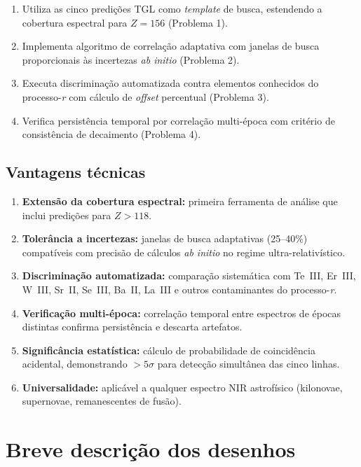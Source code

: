 \documentclass[12pt,a4paper]{article}
\begin{document}
\begin{enumerate}[leftmargin=*]
\item Utiliza as cinco predições TGL como \textit{template} de
busca, estendendo a cobertura espectral para $Z = 156$ (Problema 1).
\item Implementa algoritmo de correlação adaptativa com janelas de
busca proporcionais às incertezas \textit{ab initio} (Problema 2).
\item Executa discriminação automatizada contra elementos conhecidos
do processo-\textit{r} com cálculo de \textit{offset} percentual
(Problema 3).
\item Verifica persistência temporal por correlação multi-época
com critério de consistência de decaimento (Problema 4).
\end{enumerate}

\subsection{Vantagens técnicas}

\begin{enumerate}[leftmargin=*]
\item \textbf{Extensão da cobertura espectral:} primeira ferramenta
de análise que inclui predições para $Z > 118$.
\item \textbf{Tolerância a incertezas:} janelas de busca adaptativas
(25--40\%) compatíveis com precisão de cálculos \textit{ab initio}
no regime ultra-relativístico.
\item \textbf{Discriminação automatizada:} comparação sistemática
com Te~III, Er~III, W~III, Sr~II, Se~III, Ba~II, La~III e outros
contaminantes do processo-\textit{r}.
\item \textbf{Verificação multi-época:} correlação temporal
entre espectros de épocas distintas confirma persistência e
descarta artefatos.
\item \textbf{Significância estatística:} cálculo de probabilidade
de coincidência acidental, demonstrando $> 5\sigma$ para detecção
simultânea das cinco linhas.
\item \textbf{Universalidade:} aplicável a qualquer espectro NIR
astrofísico (kilonovae, supernovae, remanescentes de fusão).
\end{enumerate}

\newpage
\section{Breve descrição dos desenhos}
\end{document}
